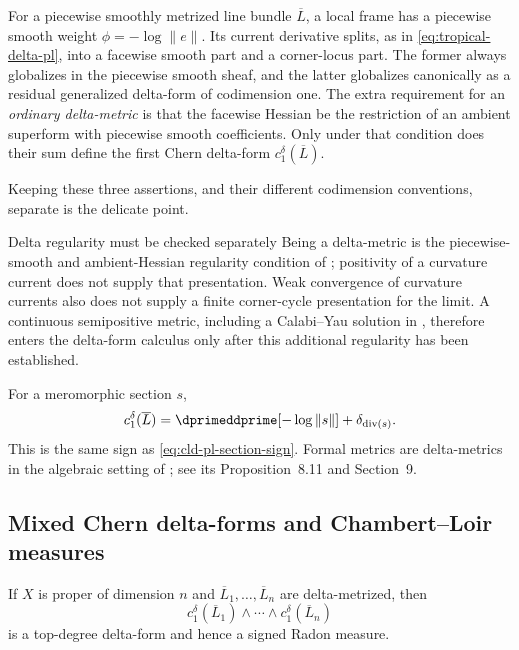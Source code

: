 For a piecewise smoothly metrized line bundle $\overline L$, a local frame
has a piecewise smooth weight $\phi=-\log\|e\|$.  Its current derivative
splits, as in \eqref{eq:tropical-delta-pl}, into a facewise smooth part and a
corner-locus part.  The former always globalizes in the piecewise smooth
sheaf, and the latter globalizes canonically as a residual generalized
delta-form of codimension one.  The extra requirement for an
\emph{ordinary delta-metric} is that the facewise Hessian be the restriction
of an ambient superform with piecewise smooth coefficients.  Only under that
condition does their sum define the first Chern delta-form
$c_1^\delta(\overline L)$.

Keeping these three assertions, and their different codimension conventions,
separate is the delicate point.




\begin{warning}{Delta regularity must be checked separately}
Being a delta-metric is the piecewise-smooth and ambient-Hessian regularity
condition of ; positivity of a curvature
current does not supply that presentation.  Weak convergence of curvature
currents also does not supply a finite corner-cycle presentation for the
limit.  A continuous semipositive metric, including a Calabi--Yau solution
in , therefore enters the delta-form calculus only after
this additional regularity has been established.
\end{warning}

For a meromorphic section $s$,
\begin{equation}
 c_1^\delta(\overline L)
   =\dprimeddprime[-\log\|s\|]+\delta_{\operatorname{div}(s)}.
\label{eq:delta-c1-section}
\end{equation}
This is the same sign as
\eqref{eq:cld-pl-section-sign}.  Formal metrics are delta-metrics in the
algebraic setting of \cite{GK17}; see its Proposition~8.11 and
Section~9.

\subsection{Mixed Chern delta-forms and Chambert--Loir measures}
\label{sec:ch18-delta-cl}

If $X$ is proper of dimension $n$ and
$\overline L_1,\ldots,\overline L_n$ are delta-metrized, then
\[
                 c_1^\delta(\overline L_1)\wedge\cdots\wedge
                 c_1^\delta(\overline L_n)
\]
is a top-degree delta-form and hence a signed Radon measure.

